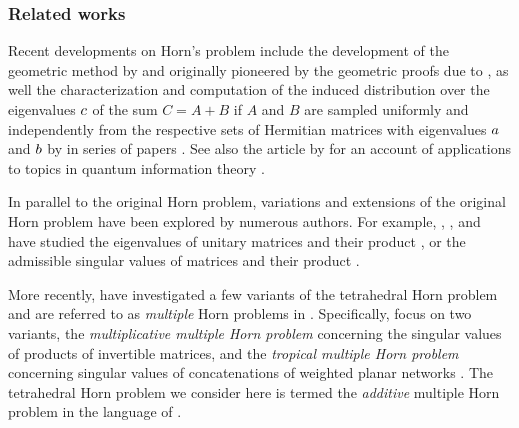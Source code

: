 \documentclass[notitlepage, 11pt, letterpaper]{amsart}
\begin{document}
\subsubsection*{Related works}
Recent developments on Horn's problem include the development of the geometric method by \citeauthor{sherman2015geometric} \cite{sherman2015geometric} and \citeauthor{berline2018horn} \cite{berline2018horn} originally pioneered by the geometric proofs due to \citeauthor{belkale2002geometric} \cite{belkale2002geometric,belkale2005geometric}, as well the characterization and computation of the induced distribution over the eigenvalues $c$ of the sum $C=A+B$ if $A$ and $B$ are sampled uniformly and independently from the respective sets of Hermitian matrices with eigenvalues $a$ and $b$ by \citeauthor{coquereaux2019revisiting} in series of papers \cite{coquereaux2018orbital,coquereaux2018orbital,coquereaux2019revisiting,zuber2018horn}.
See also the article by \citeauthor{daftuar2005quantum} for an account of applications to topics in quantum information theory \cite{daftuar2005quantum}.

In parallel to the original Horn problem, variations and extensions of the original Horn problem have been explored by numerous authors.
For example, \citeauthor{agnihotri1997eigenvalues}, \citeauthor{belkale2008quantum}, and \cite{belkale2016multiplicative} have studied the eigenvalues of unitary matrices and their product \cite{agnihotri1997eigenvalues,belkale2008quantum,belkale2016multiplicative}, or the admissible singular values of matrices and their product \cite{speyer2005horn,thompson1971eigenvaluesviii,klyachko2000random,alekseev2001linearization}.

More recently, \citeauthor{alekseev2025multiple} have investigated a few variants of the tetrahedral Horn problem and are referred to as \textit{multiple} Horn problems in \cite{alekseev2025multiple}.
Specifically, \citeauthor{alekseev2025multiple} focus on two variants, the \textit{multiplicative multiple Horn problem} concerning the singular values of products of invertible matrices, and the \textit{tropical multiple Horn problem} concerning singular values of concatenations of weighted planar networks \cite{alekseev2025multiple}.
The tetrahedral Horn problem we consider here is termed the \textit{additive} multiple Horn problem in the language of \cite{alekseev2025multiple}.
\end{document}
